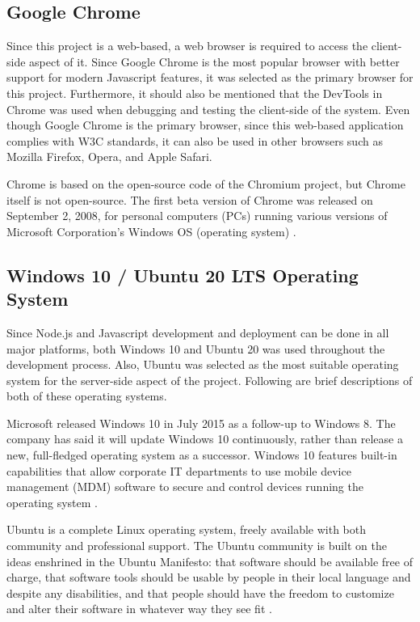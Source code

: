 \documentclass[12pt]{report}
\begin{document}
\subsection{Google Chrome}
Since this project is a web-based, a web browser is required to access the client-side aspect of it. Since Google Chrome is the most popular browser with better support for modern Javascript features, it was selected as the primary browser for this project. Furthermore, it should also be mentioned that the DevTools in Chrome was used when debugging and testing the client-side of the system. Even though Google Chrome is the primary browser, since this web-based application complies with W3C standards, it can also be used in other browsers such as Mozilla Firefox, Opera, and Apple Safari.

Chrome is based on the open-source code of the Chromium project, but Chrome itself is not open-source. The first beta version of Chrome was released on September 2, 2008, for personal computers (PCs) running various versions of Microsoft Corporation's Windows OS (operating system) \cite{hosch_2020_google_chrome}.

\subsection{Windows 10 / Ubuntu 20 LTS Operating System}
Since Node.js and Javascript development and deployment can be done in all major platforms, both Windows 10 and Ubuntu 20 was used throughout the development process. Also, Ubuntu was selected as the most suitable operating system for the server-side aspect of the project. Following are brief descriptions of both of these operating systems.

Microsoft released Windows 10 in July 2015 as a follow-up to Windows 8. The company has said it will update Windows 10 continuously, rather than release a new, full-fledged operating system as a successor. Windows 10 features built-in capabilities that allow corporate IT departments to use mobile device management (MDM) software to secure and control devices running the operating system \cite{margaretrouse_2017_windows10}.

Ubuntu is a complete Linux operating system, freely available with both community and professional support. The Ubuntu community is built on the ideas enshrined in the Ubuntu Manifesto: that software should be available free of charge, that software tools should be usable by people in their local language and despite any disabilities, and that people should have the freedom to customize and alter their software in whatever way they see fit \cite{ubuntu_2019_introduction}.
\end{document}
